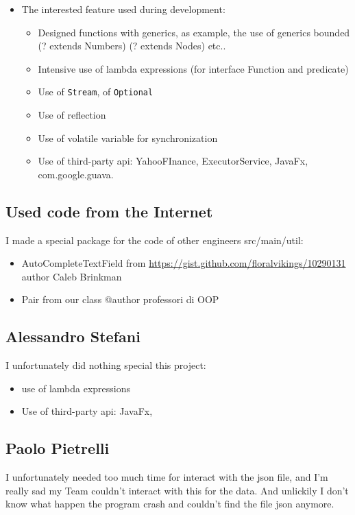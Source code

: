 \documentclass[a4paper,12pt]{report}
\begin{document}
\begin{itemize}
    \item The interested feature used during development:
    \begin{itemize}
        \item Designed functions with generics, as example, the use of generics bounded (? extends Numbers) (? extends Nodes) etc..
        \item Intensive use of lambda expressions (for interface Function and predicate)
        \item Use of \texttt{Stream}, of \texttt{Optional} 
        \item Use of reflection
        \item Use of volatile variable for synchronization
        \item Use of third-party api: YahooFInance, ExecutorService, JavaFx, com.google.guava.
    \end{itemize}
\end{itemize}

\subsection*{Used code from the Internet}

I made a special package for the code of other engineers src/main/util:
\begin{itemize}
    \item AutoCompleteTextField from \url{https://gist.github.com/floralvikings/10290131} author Caleb Brinkman
    \item Pair from our class @author professori di OOP 
\end{itemize}

\subsection{Alessandro Stefani}
I unfortunately did nothing special this project:
\begin{itemize}
    \item use of lambda expressions
    \item Use of third-party api: JavaFx,
\end{itemize}

\subsection{Paolo Pietrelli}
I unfortunately needed too much time for interact with the json file, and I'm really sad my Team couldn't interact with this for the data.
And unlickily I don't know what happen the program crash and couldn't find the file json anymore.
\end{document}
